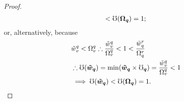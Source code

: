 \documentclass[hidelinks, nonatbib]{elsarticle}
\begin{document}
\begin{lemma}
\begin{proof}
\begin{align}
            <
            \mho(\boldsymbol{\Omega_q})
            =
            1
            ;
        \end{align}
        or, alternatively, because
        \begin{align}
            &
            \tilde{w}_{v}^{q} < \Omega_{v}^{q}
            \therefore
            \frac{
                \tilde{w}_{v}^{q}
            }{
                \Omega_{v}^{q}
            }
            < 
            1
            < 
            \frac{
                \tilde{w}_{q}^{r}
            }{
                \Omega_{q}^{r}
            }
            \\
            &\therefore
            \mho(\boldsymbol{\tilde{w}_q})
            = 
            \min(
                \boldsymbol{\tilde{w}_q}
                \times
                \boldsymbol{\mho_q}
            )
            =
            \frac{
                \tilde{w}_{v}^{q}
            }{
                \Omega_{v}^{q}
            }
            < 
            1
            \\
            &
            \implies
            \mho(\boldsymbol{\tilde{w}_q})
            <
            \mho(\boldsymbol{\Omega_q})
            =
            1
            .
        \end{align}
        

\end{proof}
\end{lemma}
\end{document}
